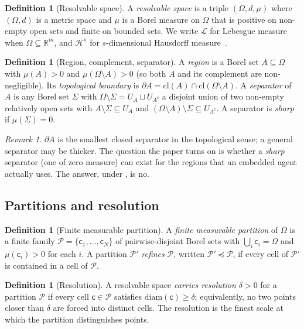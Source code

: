 \documentclass[11pt,a4paper]{article}
\theoremstyle{thmstyle}
\theoremstyle{definition}
\newtheorem{definition}[theorem]{Definition}
\theoremstyle{remark}
\newtheorem{remark}[theorem]{Remark}
\newcommand{\R}{\mathbb{R}}
\newcommand{\Space}{\Omega}
\newcommand{\Bdy}{\partial}
\newcommand{\cl}{\mathrm{cl}}
\newcommand{\diam}{\mathrm{diam}}
\newcommand{\Leb}{\mathcal{L}}
\newcommand{\Haus}{\mathcal{H}}
\newcommand{\reso}{\delta}
\newcommand{\Part}{\mathscr{P}}
\newcommand{\cell}{\mathsf{c}}
\begin{document}
\begin{definition}[Resolvable space]
\label{def:space}
A \emph{resolvable space} is a triple $(\Space,d,\mu)$ where $(\Space,d)$ is a
metric space and $\mu$ is a Borel measure on $\Space$ that is positive on
non-empty open sets and finite on bounded sets. We write $\Leb$ for Lebesgue
measure when $\Space\subseteq\R^{m}$, and $\Haus^{s}$ for $s$-dimensional
Hausdorff measure~\citep{federer1969,mattila1995}.
\end{definition}

\begin{definition}[Region, complement, separator]
\label{def:region}
A \emph{region} is a Borel set $A\subseteq\Space$ with
$\mu(A)>0$ and $\mu(\Space\setminus A)>0$ (so both $A$ and its complement are
non-negligible). Its \emph{topological boundary} is
$\Bdy A=\cl(A)\cap\cl(\Space\setminus A)$. A \emph{separator} of $A$ is any
Borel set $\Sigma$ with $\Space\setminus\Sigma=U_A\sqcup U_{A^c}$ a disjoint
union of two non-empty relatively open sets with $A\setminus\Sigma\subseteq
U_A$ and $(\Space\setminus A)\setminus\Sigma\subseteq U_{A^c}$. A separator is
\emph{sharp} if $\mu(\Sigma)=0$.
\end{definition}

\begin{remark}
$\Bdy A$ is the smallest closed separator in the topological sense; a general
separator may be thicker. The question the paper turns on is whether a
\emph{sharp} separator (one of zero measure) can exist for the regions that an
embedded agent actually uses. The answer, under , is no.
\end{remark}

\subsection{Partitions and resolution}

\begin{definition}[Finite measurable partition]
\label{def:partition}
A \emph{finite measurable partition} of $\Space$ is a finite family
$\Part=\{\cell_1,\dots,\cell_N\}$ of pairwise-disjoint Borel sets with
$\bigcup_i\cell_i=\Space$ and $\mu(\cell_i)>0$ for each $i$. A partition
$\Part'$ \emph{refines} $\Part$, written $\Part'\preceq\Part$, if every cell of
$\Part'$ is contained in a cell of $\Part$.
\end{definition}

\begin{definition}[Resolution]
\label{def:resolution}
A resolvable space \emph{carries resolution $\reso>0$} for a partition $\Part$
if every cell $\cell\in\Part$ satisfies $\diam(\cell)\ge\reso$; equivalently, no
two points closer than $\reso$ are forced into distinct cells. The resolution
is the finest scale at which the partition distinguishes points.
\end{definition}
\end{document}
